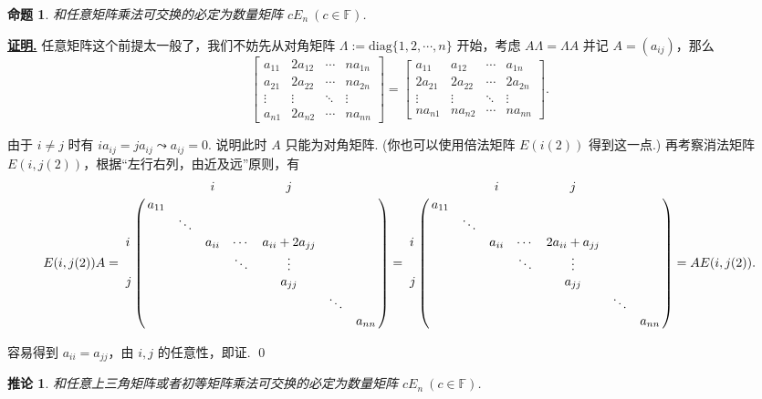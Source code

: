 \documentclass[10pt,openany]{article}
\theoremstyle{thmstyle} %
\theoremstyle{defstyle} %
\newtheorem{corollary}[theorem]{推论}
\theoremstyle{prostyle} %
\newtheorem{proposition}[theorem]{命题}
\theoremstyle{exastyle}
\theoremstyle{remstyle}
\renewenvironment{proof}[1][证明]{\par\underline{\textbf{#1.}} \;\fangsong}{\qed\par}
\newcommand{\F}{\mathbb{F}}
\begin{document}
\begin{proposition}
	和任意矩阵乘法可交换的必定为数量矩阵 \( cE_n \ (c \in \F)\).
	\label{1.3.20}
\end{proposition}

\begin{proof}
	任意矩阵这个前提太一般了，我们不妨先从对角矩阵 \( \Lambda:=\mathrm{diag}\{1,2,\cdots,n\} \) 开始，考虑 \( A\Lambda=\Lambda A \) 并记 \( A=(a_{ij}) \)，那么
	\[ \begin{bmatrix}
		a_{11} & 2a_{12} & \cdots & na_{1n} \\
		a_{21} & 2a_{22} & \cdots & na_{2n} \\
		\vdots & \vdots & \ddots & \vdots \\
		a_{n1} & 2a_{n2} & \cdots & na_{nn}
	\end{bmatrix}=\begin{bmatrix}
		a_{11} & a_{12} & \cdots & a_{1n} \\
		2a_{21} & 2a_{22} & \cdots & 2a_{2n} \\
	    \vdots & \vdots & \ddots & \vdots \\
	    na_{n1} & na_{n2} & \cdots & na_{nn}
	\end{bmatrix}. \]
	
	由于 \( i \neq j \) 时有 \( ia_{ij}=ja_{ij} \leadsto a_{ij}=0 \). 说明此时 \( A \) 只能为对角矩阵. (你也可以使用倍法矩阵 \( E(i(2)) \) 得到这一点.) 再考察消法矩阵 \( E(i,j(2)) \)，根据“左行右列，由近及远”原则，有
	\[ E(i,j(2))A= \bordermatrix{
		& & & \textbf{\(i\)} & & \textbf{\(j\)} & & \cr
		& a_{11} & & & & & &  \cr
		& & \ddots & & & & &  \cr
		\textbf{\(i\)}	& & & a_{ii} & \cdots & a_{ii}+2a_{jj} & &  \cr
		& & & & \ddots & \vdots & &  \cr
		\textbf{\(j\)}	& & & & & a_{jj} & &  \cr
		& & & & & & \ddots  &  \cr
		& & & & & & & a_{nn} \cr
	}= \bordermatrix{
	& & & \textbf{\(i\)} & & \textbf{\(j\)} & & \cr
	& a_{11} & & & & & &  \cr
	& & \ddots & & & & &  \cr
	\textbf{\(i\)}	& & & a_{ii} & \cdots & 2a_{ii}+a_{jj} & &  \cr
	& & & & \ddots & \vdots & &  \cr
	\textbf{\(j\)}	& & & & & a_{jj} & &  \cr
	& & & & & & \ddots  &  \cr
	& & & & & & & a_{nn} \cr
	}=AE(i,j(2)). \]
	
	容易得到 \( a_{ii}=a_{jj} \)，由 \( i,j \) 的任意性，即证.
\end{proof}

\begin{corollary}
	和任意上三角矩阵或者初等矩阵乘法可交换的必定为数量矩阵 \( cE_n  \ (c \in \F) \).
\end{corollary}
\end{document}
